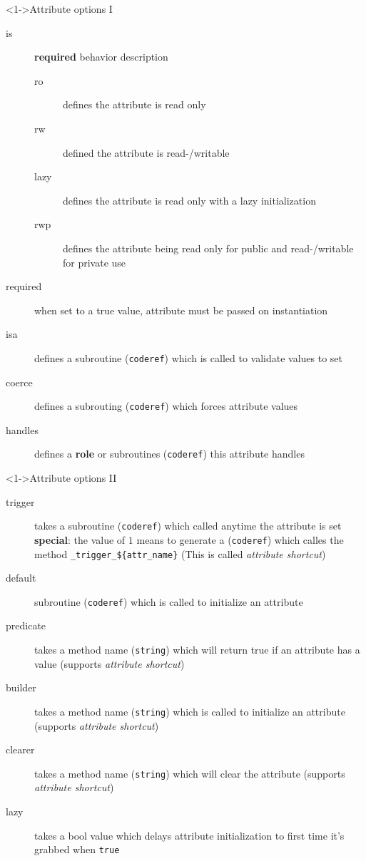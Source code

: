 \documentclass[ngerman,xcolor={table,dvipsnames},scriptsizeer,compress,hyperref={bookmarks,colorlinks}]{beamer}
\begin{document}
\begin{frame}[fragile]

\begin{block}<1->{Attribute options I}
\begin{description}
\item[is] \textbf{required} behavior description
    \begin{description}
    \item[ro] defines the attribute is read only
    \item[rw] defined the attribute is read-/writable
    \item[lazy] defines the attribute is read only with a lazy initialization
    \item[rwp] defines the attribute being read only for public and read-/writable for private use
    \end{description}
\item[required] when set to a true value, attribute must be passed on instantiation
\item[isa] defines a subroutine (\texttt{coderef}) which is called to validate values to set
\item[coerce] defines a subrouting (\texttt{coderef}) which forces attribute values
\item[handles] defines a \textbf{role} or subroutines (\texttt{coderef}) this attribute handles
\end{description}
\end{block}

\end{frame}

\begin{frame}[fragile]

\begin{block}<1->{Attribute options II}
\begin{description}
\item[trigger] takes a subroutine (\texttt{coderef}) which called anytime the attribute is set \\
    \textbf{special}: the value of $ 1 $ means to generate a (\texttt{coderef}) which calles the method \texttt{\_trigger\_\$\{attr\_name\}} (This is called \textit{attribute shortcut})
\item[default] subroutine (\texttt{coderef}) which is called to initialize an attribute
\item[predicate] takes a method name (\texttt{string}) which will return true if an attribute has a value (supports \textit{attribute shortcut})
\item[builder] takes a method name (\texttt{string}) which is called to initialize an attribute (supports \textit{attribute shortcut})
\item[clearer] takes a method name (\texttt{string}) which will clear the attribute (supports \textit{attribute shortcut})
\item[lazy] takes a bool value which delays attribute initialization to first time it's grabbed when \texttt{true}
\end{description}
\end{block}

\end{frame}
\end{document}
